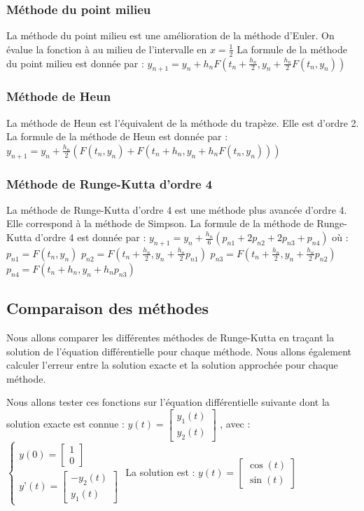\documentclass{article}
\begin{document}
\subsubsection{Méthode du point milieu}
La méthode du point milieu est une amélioration de la méthode d'Euler. On évalue la fonction à au milieu de l'intervalle en \(x=\frac{1}{2}\)
La formule de la méthode du point milieu est donnée par :
\(y_{n+1} = y_n + h_n F(t_n + \frac{h_n}{2}, y_n + \frac{h_n}{2} F(t_n, y_n))\)

\subsubsection{Méthode de Heun}
La méthode de Heun est l'équivalent de la méthode du trapèze. Elle est d'ordre 2. La formule de la méthode de Heun est donnée par :
\(y_{n+1} = y_n + \frac{h_n}{2} ( F(t_n, y_n) + F(t_n + h_n, y_n + h_n F(t_n, y_n)) )\)

\subsubsection{Méthode de Runge-Kutta d'ordre 4}
La méthode de Runge-Kutta d'ordre 4 est une méthode plus avancée d'ordre 4. Elle correspond à la méthode de Simpson. La formule de la méthode de Runge-Kutta d'ordre 4 est donnée par :
\(y_{n+1} = y_n + \frac{h_n}{6} ( p_{n1} + 2p_{n2} + 2p_{n3} + p_{n4} )\) où :
\(p_{n1} = F(t_n, y_n)\)
\(p_{n2} = F(t_n + \frac{h_n}{2}, y_n + \frac{h_n}{2} p_{n1})\)
\(p_{n3} = F(t_n + \frac{h_n}{2}, y_n + \frac{h_n}{2} p_{n2})\)
\(p_{n4} = F(t_n + h_n, y_n + h_n p_{n3})\)

\subsection{Comparaison des méthodes}
Nous allons comparer les différentes méthodes de Runge-Kutta en traçant la solution de l'équation différentielle pour chaque méthode. Nous allons également calculer l'erreur entre la solution exacte et la solution approchée pour chaque méthode.

Nous allons tester ces fonctions sur l'équation différentielle suivante dont la solution exacte est connue :
\(y(t) = \left[ \begin{array}{c} y_1(t) \\ y_2(t) \end{array} \right]\)
, avec :
\(\begin{cases} y(0) = \left[ \begin{array}{c} 1 \\ 0 \end{array} \right] \\ y’(t) = \left[ \begin{array}{c} -y_2(t) \\ y_1(t) \end{array} \right] \end{cases}\)
La solution est :
\(y(t) = \left[ \begin{array}{c} \cos(t) \\ \sin(t) \end{array} \right] \)
\end{document}
